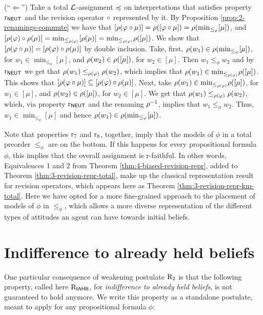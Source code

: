 \begin{prf*}{}{}
	(``$\Leftarrow$'')
	Take a total $\mathcal{L}$-assignment $\preccurlyeq$ on interpretations 
	that satisfies property $\mathrm{r}_{\mathsf{NEUT}}$
	and the revision operator $\circ$ represented by it.
	By Proposition \ref{prop:2-renamings-commute}
	we have that 
	$
	[\rho(\varphi\circ\mu)]=
	\rho([\varphi\circ\mu])=
	\rho({\operatorname{min}}_{\le_{\varphi}}[\mu])
	$,		
	and
	$
	[\rho(\varphi)\circ\rho(\mu)]= 
	{\operatorname{min}}_{\le_{\rho(\varphi)}}[\rho(\mu)]=
	{\operatorname{min}}_{\le_{\rho(\varphi)}}\rho([\mu])
	$.
	We show that 
	$[\rho(\varphi\circ\mu)]=[\rho(\varphi)\circ\rho(\mu)]$
	by double inclusion.
	Take, first, $\rho(w_1)\in\rho({\operatorname{min}}_{\le_{\varphi}}[\mu])$,
	for $w_1\in\min_{\le_\phi} [\mu]$,
	and $\rho(w_2)\in\rho([\mu])$,
	for $w_2\in[\mu]$.
	Then $w_1\le_\phi w_2$ and by $\mathrm{r}_{\mathsf{NEUT}}$
	we get that $\rho(w_1)\le_{\rho(\varphi)}\rho(w_2)$,
	which implies that $\rho(w_1)\in{\operatorname{min}}_{\le_{\rho(\varphi)}}\rho([\mu])$.
	This shows that 
	$[\rho(\varphi\circ\mu)]\subseteq[\rho(\varphi)\circ\rho(\mu)]$.	
	Next, take $\rho(w_1)\in{\operatorname{min}}_{\le_{\rho(\varphi)}}\rho([\mu])$,
	for $w_1\in[\mu]$,
	and $\rho(w_2)\in\rho([\mu])$,
	for $w_2\in[\mu]$.
	We get that $\rho(w_1)\le_{\rho(\varphi)}\rho(w_2)$,
	which, via property $\mathrm{r}_{\mathsf{NEUT}}$ and the renaming $\rho^{-1}$,
	implies that $w_1\le_\phi w_2$.
	Thus, $w_1\in\min_{\le_\phi} [\mu]$ and hence
	$\rho(w_1)\in\rho({\operatorname{min}}_{\le_\varphi}[\mu])$.
\end{prf*}

Note that properties $\mathrm{r}_{7}$ and $\mathrm{r}_{8}$, together,
imply that the models of $\phi$ in a total preorder $\le_\phi$ 
are on the bottom.
If this happens for every propositional formula $\phi$,
this implies that the overall assignment is r-faithful.
In other words, Equivalences 1 and 2 from Theorem \ref{thm:4-biased-revision-repr},
added to Theorem \ref{thm:3-revision-repr-total}, make up the classical  representation
result for revision operators, which appears here as Theorem \ref{thm:3-revision-repr-km-total}.
Here we have opted for a more fine-grained approach
to the placement of models of $\phi$ in $\le_\phi$,
which allows a more diverse representation of the different types
of attitudes an agent can have towards initial beliefs.

\section{Indifference to already held beliefs}\label{sec:4-iahb}
One particular consequence of weakening 
postulate $\mathrm{R}_{2}$ 
is that the following property,
called here $\mathrm{R}_{\mathsf{IAHB}}$,
for \emph{indifference to already held beliefs},
is not guaranteed to hold anymore.
We write this property as a standalone postulate, meant to apply 
for any propositional formula $\phi$:


